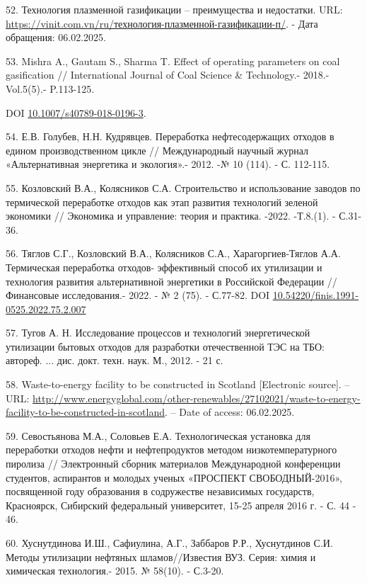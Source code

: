 \begin{references}
52. Технология плазменной газификации -- преимущества и недостатки. URL:
\url{https://vinit.com.vn/ru/технология-плазменной-газификации-п/}. -
Дата обращения: 06.02.2025.

53. Mishra A., Gautam S., Sharma T. Effect of operating parameters on
coal gasification // International Journal of Coal Science \&
Technology.- 2018.- Vol.5(5).- P.113-125.

DOI
\href{http://dx.doi.org/10.1007/s40789-018-0196-3}{10.1007/s40789-018-0196-3}.

54. Е.В. Голубев, Н.Н. Кудрявцев. Переработка нефтесодержащих отходов в
едином производственном цикле // Международный научный журнал
«Альтернативная энергетика и экология».- 2012. -№ 10 (114). - С.
112-115.

55. Козловский В.А., Колясников С.А. Строительство и использование
заводов по термической переработке отходов как этап развития технологий
зеленой экономики // Экономика и управление: теория и практика. -2022.
-Т.8.(1). - С.31-36.

56. Тяглов С.Г., Козловский В.А., Колясников С.А., Харагоргиев-Тяглов
А.А. Термическая переработка отходов- эффективный способ их утилизации и
технология развития альтернативной энергетики в Российской Федерации //
Финансовые исследования.- 2022. - № 2 (75). - С.77-82. DOI
\href{https://doi.org/10.54220/finis.1991-0525.2022.75.2.007}{10.54220/finis.1991-0525.2022.75.2.007}

57. Тугов А. Н. Исследование процессов и технологий энергетической
утилизации бытовых отходов для разработки отечественной ТЭС на ТБО:
автореф. ... дис. докт. техн. наук. М., 2012. - 21 с.

58. Waste-to-energy facility to be constructed in Scotland {[}Electronic
source{]}. -- URL:
\url{http://www.energyglobal.com/other-renewables/27102021/waste-to-energy-facility-to-be-constructed-in-scotland}.
-- Date of access: 06.02.2025.

59. Севостьянова М.А., Соловьев Е.А. Технологическая установка для
переработки отходов нефти и нефтепродуктов методом низкотемпературного
пиролиза // Электронный сборник материалов Международной конференции
студентов, аспирантов и молодых ученых «ПРОСПЕКТ СВОБОДНЫЙ-2016»,
посвященной году образования в содружестве независимых государств,
Красноярск, Сибирский федеральный университет, 15-25 апреля 2016 г. - С.
44 - 46.

60. Хуснутдинова И.Ш., Сафиулина, А.Г., Заббаров Р.Р., Хуснутдинов С.И.
Методы утилизации нефтя­ных шламов//Известия ВУЗ. Серия: химия и
химическая технология.- 2015. № 58(10). - С.3-20.


\end{references}
